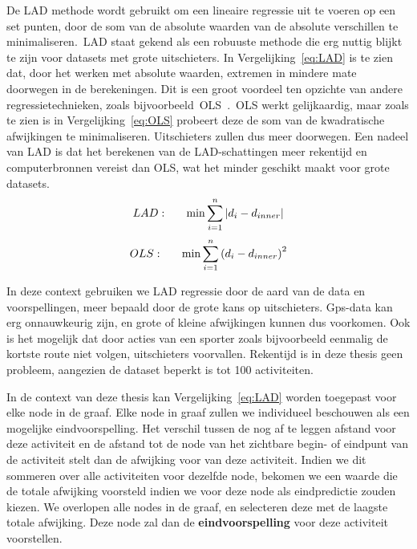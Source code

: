 De \ac{LAD} methode wordt gebruikt om een lineaire regressie uit te voeren op
een set punten, door de som van de absolute waarden van de absolute verschillen
te minimaliseren.\ \ac{LAD} staat gekend als een robuuste methode die erg
nuttig blijkt te zijn voor datasets met grote uitschieters. In
Vergelijking~\ref{eq:LAD} is te zien dat, door het werken met absolute waarden,
extremen in mindere mate doorwegen in de berekeningen. Dit is een groot
voordeel ten opzichte van andere regressietechnieken, zoals
bijvoorbeeld~\ac{OLS}~\cite{iqbal2021application}.~\ac{OLS} werkt gelijkaardig,
maar zoals te zien is in Vergelijking~\ref{eq:OLS} probeert deze de som van de
kwadratische afwijkingen te minimaliseren. Uitschieters zullen dus meer
doorwegen. Een nadeel van \ac{LAD} is dat het berekenen van de LAD-schattingen
meer rekentijd en computerbronnen vereist dan \ac{OLS}, wat het minder geschikt
maakt voor grote datasets.
\begin{equation} \label{eq:LAD}
    LAD:\indent  \min\sum\limits_{i=1}^n|d_i - d_{inner}|
\end{equation}
\begin{equation} \label{eq:OLS}
    OLS:\indent  \min\sum\limits_{i=1}^n{(d_i - d_{inner})}^2
\end{equation}

In deze context gebruiken we LAD regressie door de aard van de data en
voorspellingen, meer bepaald door de grote kans op uitschieters. Gps-data kan
erg onnauwkeurig zijn, en grote of kleine afwijkingen kunnen dus voorkomen. Ook
is het mogelijk dat door acties van een sporter zoals bijvoorbeeld eenmalig de
kortste route niet volgen, uitschieters voorvallen. Rekentijd is in deze thesis
geen probleem, aangezien de dataset beperkt is tot 100 activiteiten.

In de context van deze thesis kan Vergelijking~\ref{eq:LAD} worden toegepast
voor elke node in de graaf. Elke node in graaf zullen we individueel beschouwen
als een mogelijke eindvoorspelling. Het verschil tussen de nog af te leggen
afstand voor deze activiteit en de afstand tot de node van het zichtbare begin-
of eindpunt van de activiteit stelt dan de afwijking voor van deze activiteit.
Indien we dit sommeren over alle activiteiten voor dezelfde node, bekomen we
een waarde die de totale afwijking voorsteld indien we voor deze node als
eindpredictie zouden kiezen. We overlopen alle nodes in de graaf, en selecteren
deze met de laagste totale afwijking. Deze node zal dan de
\textbf{eindvoorspelling} voor deze activiteit voorstellen.

